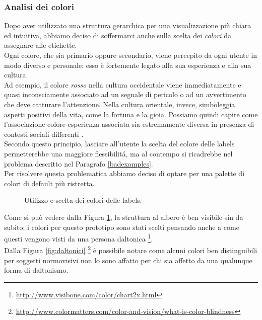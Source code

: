 \documentclass[12pt]{article} %
\begin{document}
\subsubsection{Analisi dei colori}
Dopo aver utilizzato una struttura gerarchica per una visualizzazione più chiara ed intuitiva, abbiamo deciso di soffermarci anche sulla scelta dei \emph{colori} da assegnare alle etichette.\\
Ogni colore, che sia primario oppure secondario, viene percepito da ogni utente in modo diverso e personale: esso \`e fortemente legato alla sua esperienza e alla sua cultura.\\
Ad esempio, il colore \emph{rosso} nella cultura occidentale viene immediatamente e quasi inconsciamente associato ad un segnale di pericolo o ad un avvertimento che deve catturare l'attenzione. Nella cultura orientale, invece, simboleggia aspetti positivi della vita, come la fortuna e la gioia. Possiamo quindi capire come l'associazione colore-esperienza associata sia estremamente diversa in presenza di contesti sociali differenti \cite[p.~9-12]{thesis}.\\
Secondo questo principio, lasciare all'utente la scelta del colore delle labels permetterebbe una maggiore flessibilit\'a, ma al contempo si ricadrebbe nel problema descritto nel Paragrafo \ref{badexamples}.\\
Per risolvere questa problematica abbiamo deciso di optare per una palette di colori di default più ristretta.

\begin{figure}[H] 
\caption{Utilizzo e scelta dei colori delle labels.}
\label{fig:finale}
\end{figure}

Come si può vedere dalla Figura \ref{fig:finale}, la struttura al albero \`e ben visibile sin da subito; i colori per questo prototipo sono stati scelti pensando anche a come questi vengono visti da una persona daltonica \footnote{\url{http://www.visibone.com/color/chart2x.html}}.\\
Dalla Figura \ref{fig:daltonici} \footnote{\url{http://www.colormatters.com/color-and-vision/what-is-color-blindness}} \`e possibile notare come alcuni colori ben distinguibili per soggetti normovisivi non lo sono affatto per chi sia affetto da una qualunque forma di daltonismo.
\end{document}
